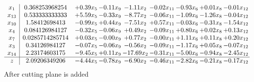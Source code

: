 \documentclass[8pt]{article}
\begin{document}
\[\begin{array}{c| c c@{\hskip 2pt} c@{\hskip 2pt} c@{\hskip 2pt} c@{\hskip 2pt} c@{\hskip 2pt} c@{\hskip 2pt} c@{\hskip 2pt} }
 x_{1}   &  0.368253968254 & +  0.39 x_{5} & -0.11 x_{9} & -1.11 x_{2} & -0.02 x_{11} & -0.93 x_{6} & +  0.01 x_{8} & -0.01 x_{12}\\
 x_{13}   &  0.533333333333 & +  5.59 x_{5} & -0.33 x_{9} & -8.77 x_{2} & -0.06 x_{11} & -1.09 x_{6} & -1.26 x_{8} & -0.04 x_{12}\\
 x_{10}   &  1.58412698413 & -0.99 x_{5} & +  0.44 x_{9} & -7.51 x_{2} & +  0.57 x_{11} & -0.03 x_{6} & -0.31 x_{8} & -1.54 x_{12}\\
 x_{4}   &  0.084126984127 & -0.32 x_{5} & -0.06 x_{9} & +  0.49 x_{2} & -0.09 x_{11} & +  0.80 x_{6} & +  0.02 x_{8} & +  0.13 x_{12}\\
 x_{7}   &  0.0285714285714 & +  0.03 x_{5} & -0.00 x_{9} & +  0.77 x_{2} & -0.00 x_{11} & +  1.11 x_{6} & +  0.11 x_{8} & +  0.20 x_{12}\\
 x_{3}   &  0.34126984127 & -0.07 x_{5} & -0.06 x_{9} & -0.56 x_{2} & -0.09 x_{11} & -1.17 x_{6} & +  0.05 x_{8} & -0.07 x_{12}\\
 x_{14}   &  2.23174603175 & -9.45 x_{5} & +  0.11 x_{9} & -17.69 x_{2} & -0.31 x_{11} & -5.00 x_{6} & -0.94 x_{8} & -2.45 x_{12}\\
\hline
z    &  2.09206349206 & -4.44 x_{5} & -0.78 x_{9} & -6.90 x_{2} & -0.46 x_{11} & -2.82 x_{6} & -0.21 x_{8} & -0.17 x_{12}\\
\end{array}\]
 After cutting plane is added 
\end{document}
